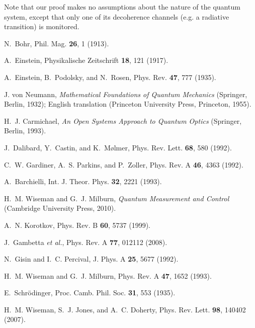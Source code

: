 \documentclass[12pt,prl,floatfix,showpacs,superscriptaddress,amsmath,amssymb]{revtex4}
\newcommand{\blk}{\color{black}}
\newcommand{\ea}{{\it et al.}}
\renewcommand{\(}{\left(}
\renewcommand{\)}{\right)}
\begin{document}
{\begin{widetext}
Note that our proof makes no assumptions about the nature of the quantum system, except that only one of its decoherence channels (e.g. a radiative transition) is monitored. 

\end{widetext}
 \begin{thebibliography}{10}

N.~Bohr, Phil. Mag. \textbf{26}, 1 (1913).

A.~{Einstein}, Physikalische Zeitschrift \textbf{18}, 121 (1917).

A.~{Einstein}, B.~{Podolsky}, and N.~{Rosen}, Phys. Rev. \textbf{47}, 777
  (1935).
  
J. von Neumann, {\em Mathematical Foundations of Quantum Mechanics}
(Springer, Berlin, 1932);
English translation (Princeton University Press, Princeton, 1955). \blk

H.~J. Carmichael, \emph{An Open Systems Approach to Quantum Optics} (Springer,
  Berlin, 1993).

J.~Dalibard, Y.~Castin, and K.~M\o{}lmer, Phys. Rev. Lett. \textbf{68}, 580
  (1992).

C.~W. Gardiner, A.~S. Parkins, and P.~Zoller, Phys. Rev. A \textbf{46}, 4363
  (1992).

A.~Barchielli, Int. J. Theor. Phys. \textbf{32}, 2221 (1993).


H.~M. Wiseman and G.~J. Milburn, \emph{Quantum Measurement and Control}
  (Cambridge University Press, 2010).

A.~N. Korotkov, Phys. Rev. B \textbf{60}, 5737 (1999).

J.~Gambetta \ea, Phys. Rev. A \textbf{77}, 012112 (2008).

N.~Gisin and I.~C. Percival, J. Phys. A \textbf{25}, 5677 (1992).


H.~M. Wiseman and G.~J. Milburn, Phys. Rev. A \textbf{47}, 1652 (1993).

E.~Schr\"odinger, Proc. Camb. Phil. Soc. \textbf{31}, 553 (1935).

H.~M. Wiseman, S.~J. Jones, and A.~C. Doherty, Phys. Rev. Lett. \textbf{98},
  140402 (2007).


\end{thebibliography}}
\end{document}
